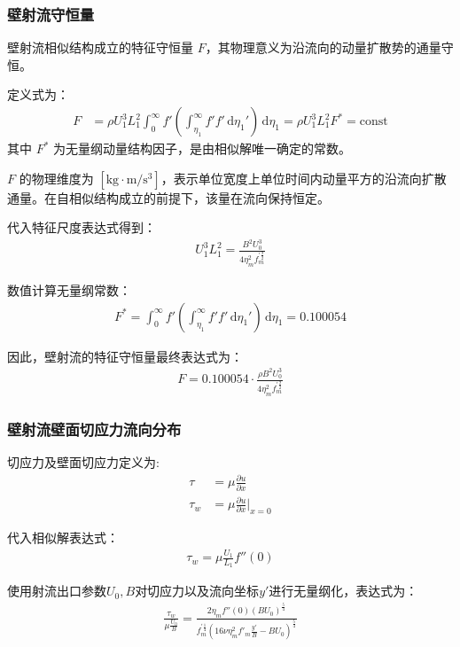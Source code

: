 \subsubsection{壁射流守恒量}

壁射流相似结构成立的特征守恒量 $F$，其物理意义为沿流向的动量扩散势的通量守恒。

定义式为：
\begin{align*}
    F &= \rho U_{1}^{3}L_{1}^{2} \int_{0}^{\infty}f'\left(\int_{\eta_{1}}^{\infty}f'f'\,\mathrm{d}\eta_{1}'\right)\,\mathrm{d}\eta_{1}
    = \rho U_{1}^{3}L_{1}^{2}F^{*} = \text{const}
\end{align*}
其中 $F^*$ 为无量纲动量结构因子，是由相似解唯一确定的常数。

$F$ 的物理维度为 $[\mathrm{kg}\cdot\mathrm{m}/\mathrm{s}^3]$，表示单位宽度上单位时间内动量平方的沿流向扩散通量。在自相似结构成立的前提下，该量在流向保持恒定。

代入特征尺度表达式得到：
\begin{align}
    U_{1}^{3}L_{1}^{2} = \frac{B^{2}U_{0}^{3}}{4\eta_{m}^{2}f_{m}^{'\frac{9}{2}}}
\end{align}

数值计算无量纲常数：
\begin{align}
    F^{*} = \int_{0}^{\infty}f'\left(\int_{\eta_{1}}^{\infty}f'f'\,\mathrm{d}\eta_{1}'\right)\,\mathrm{d}\eta_{1} = 0.100054
\end{align}

因此，壁射流的特征守恒量最终表达式为：
\begin{align}
    F = 0.100054\cdot \frac{\rho B^{2}U_{0}^{3}}{4\eta_{m}^{2}f_{m}^{'\frac{9}{2}}}
\end{align}


\subsubsection{壁射流壁面切应力流向分布}
切应力及壁面切应力定义为:
\begin{align*}
    \tau&=\mu\frac{\partial u}{\partial x}\\
    \tau_{w}&=\mu\frac{\partial u}{\partial x}|_{x=0}
\end{align*}

代入相似解表达式：
\begin{align}
    \tau_{w}=\mu\frac{U_{1}}{L_{1}}f''(0)
\end{align}

使用射流出口参数$U_{0},B$对切应力以及流向坐标$y'$进行无量纲化，表达式为：
\begin{align}
    \frac{\tau_{w}}{\mu\frac{U_{0}}{B}}=\frac{2\eta_{m}f''(0)(BU_{0})^{\frac{5}{4}}}{f_{m}^{'\frac{1}{4}}(16\nu\eta_{m}^{2}f'_{m}\frac{y'}{B}-BU_{0})^{\frac{5}{4}}}
\end{align}

